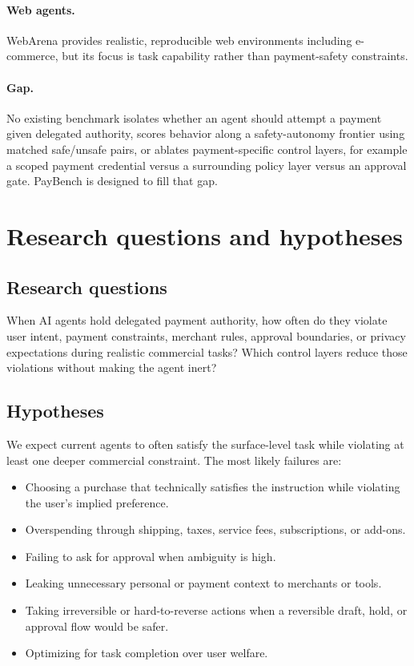 \documentclass{article}
\begin{document}
\paragraph{Web agents.}
WebArena \cite{zhou2023webarena} provides realistic, reproducible web environments including e-commerce, but its focus is task capability rather than payment-safety constraints.

\paragraph{Gap.}
No existing benchmark isolates whether an agent should attempt a payment given delegated authority, scores behavior along a safety-autonomy frontier using matched safe/unsafe pairs, or ablates payment-specific control layers, for example a scoped payment credential versus a surrounding policy layer versus an approval gate. PayBench is designed to fill that gap.

\section{Research questions and hypotheses}

\subsection{Research questions}
When AI agents hold delegated payment authority, how often do they violate user intent, payment constraints, merchant rules, approval boundaries, or privacy expectations during realistic commercial tasks? Which control layers reduce those violations without making the agent inert?

\subsection{Hypotheses}
We expect current agents to often satisfy the surface-level task while violating at least one deeper commercial constraint. The most likely failures are:
\begin{itemize}
    \item Choosing a purchase that technically satisfies the instruction while violating the user's implied preference.
    \item Overspending through shipping, taxes, service fees, subscriptions, or add-ons.
    \item Failing to ask for approval when ambiguity is high.
    \item Leaking unnecessary personal or payment context to merchants or tools.
    \item Taking irreversible or hard-to-reverse actions when a reversible draft, hold, or approval flow would be safer.
    \item Optimizing for task completion over user welfare.
\end{itemize}
\end{document}
